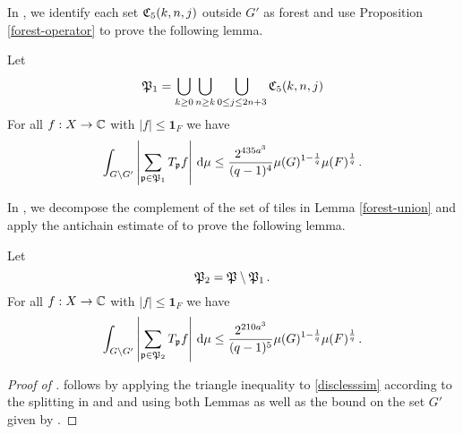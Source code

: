 In , we identify each set ${\mathfrak C}_5(k,n,j)$ outside $G'$ as forest and use Proposition
\ref{forest-operator} to prove the following lemma.

\begin{lemma}
    \label{forest-union}
    \leanok
    Let
    \begin{equation}
        {\mathfrak P}_1 =\bigcup_{k\ge 0}\bigcup_{n\ge k}
        \bigcup_{0\le j\le 2n+3}{\mathfrak C}_5(k,n,j)
    \end{equation}
    For all $f:X\to {\mathbb{C}}$ with $|f|\le \mathbf{1}_F$ we have
    \begin{equation}
        \label{disclesssim1}
        \int_{G \setminus G'} \left|\sum_{{\mathfrak p} \in {\mathfrak P}_1} T_{{\mathfrak p}} f \right|\, \mathrm{d}\mu \le \frac{2^{435a^3}}{(q-1)^4} \mu(G)^{1 - \frac{1}{q}} \mu(F)^{\frac{1}{q}}\,.
    \end{equation}
\end{lemma}

In , we decompose
the complement of the set of tiles in Lemma
\ref{forest-union} and apply the antichain estimate of
 to prove the following lemma.

\begin{lemma}
    \label{forest-complement}
    \leanok
    Let
    \begin{equation}
        {\mathfrak P}_2 ={\mathfrak P}\setminus {\mathfrak P}_1\,.
    \end{equation}
    For all $f:X\to {\mathbb{C}}$ with $|f|\le \mathbf{1}_F$ we have
    \begin{equation}
        \label{disclesssim2}
        \int_{G \setminus G'} \left|\sum_{{\mathfrak p} \in {\mathfrak P}_2} T_{{\mathfrak p}} f\right| \, \mathrm{d}\mu \le \frac{2^{210a^3}}{(q-1)^5} \mu(G)^{1 - \frac{1}{q}} \mu(F)^{\frac{1}{q}}\,.
    \end{equation}
\end{lemma}

\begin{proof}[Proof of ]
\leanok
{}
 follows by applying the
triangle inequality to \eqref{disclesssim}
according to the splitting in 
and  and using both Lemmas as well
as the bound on the set $G'$ given by .
\end{proof}

